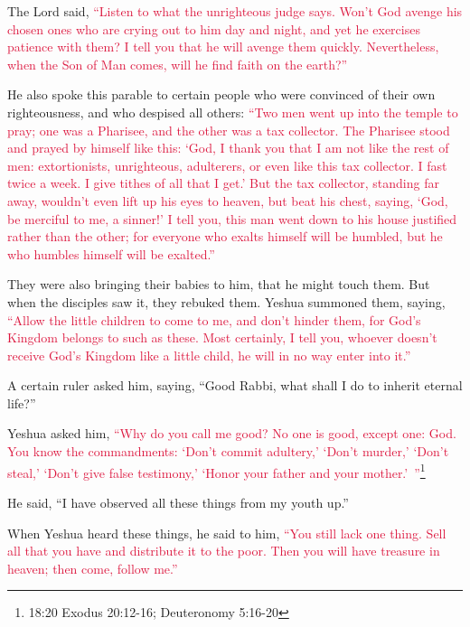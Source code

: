 \myverse{}The Lord said,
\textcolor{crimson}{“Listen to what the unrighteous judge says.
}
\myverse{}\textcolor{crimson}{Won’t God avenge his chosen ones who are crying out to him day and night,
	and yet he exercises patience with them?
}
\myverse{}\textcolor{crimson}{I tell you that he will avenge them quickly. Nevertheless, when the Son
	of Man comes, will he find faith on the earth?”}

\myverse{}He also spoke this parable to certain people who were convinced
of their own righteousness, and who despised all others:
\myverse{}\textcolor{crimson}{“Two men went up into the temple to pray; one was a Pharisee, and the
	other was a tax collector.
}
\myverse{}\textcolor{crimson}{The Pharisee stood and prayed by himself like this: ‘God, I thank you
	that I am not like the rest of men: extortionists, unrighteous, adulterers, or even like this tax collector.
}
\myverse{}\textcolor{crimson}{I fast twice a week. I give tithes of all that I get.’
}
\myverse{}\textcolor{crimson}{But the tax collector, standing far away, wouldn’t even lift up his eyes
	to heaven, but beat his chest, saying, ‘God, be merciful to me, a sinner!’
}
\myverse{}\textcolor{crimson}{I tell you, this man went down to his house justified rather than the
	other; for everyone who exalts himself will be humbled, but he who humbles himself will be exalted.”}

\myverse{}They were also bringing their babies to him, that he might touch
them. But when the disciples saw it, they rebuked them.
\myverse{}Yeshua summoned them, saying,
\textcolor{crimson}{“Allow the little children to come to me, and don’t hinder them, for God’s Kingdom belongs to such
	as these.
}
\myverse{}\textcolor{crimson}{Most certainly, I tell you, whoever doesn’t receive God’s Kingdom like
	a little child, he will in no way enter into it.”}

\myverse{}A certain ruler asked him, saying, “Good Rabbi, what shall I
do to inherit eternal life?”

\myverse{}Yeshua asked him,
\textcolor{crimson}{“Why do you call me good? No one is good, except one: God.
}
\myverse{}\textcolor{crimson}{You know the commandments: ‘Don’t commit adultery,’ ‘Don’t murder,’ ‘Don’t
	steal,’ ‘Don’t give false testimony,’ ‘Honor your father and your mother.’ ”}\footnote{ 18:20 Exodus 20:12-16;
	Deuteronomy 5:16-20}

\myverse{}He said, “I have observed all these things from my youth up.”

\myverse{}When Yeshua heard these things, he said to him,
\textcolor{crimson}{“You still lack one thing. Sell all that you have and distribute it to the poor. Then you will have
	treasure in heaven; then come, follow me.”}

